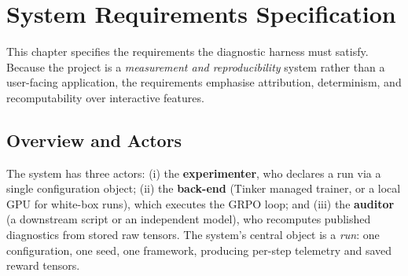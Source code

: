 \chapter{System Requirements Specification}
\label{ch:srs}

This chapter specifies the requirements the diagnostic harness must satisfy. Because
the project is a \emph{measurement and reproducibility} system rather than a
user-facing application, the requirements emphasise attribution, determinism, and
recomputability over interactive features.

\section{Overview and Actors}
The system has three actors: (i) the \textbf{experimenter}, who declares a run via a
single configuration object; (ii) the \textbf{back-end} (Tinker managed trainer, or
a local GPU for white-box runs), which executes the GRPO loop; and (iii) the
\textbf{auditor} (a downstream script or an independent model), who recomputes
published diagnostics from stored raw tensors. The system's central object is a
\emph{run}: one configuration, one seed, one framework, producing per-step telemetry
and saved reward tensors.

